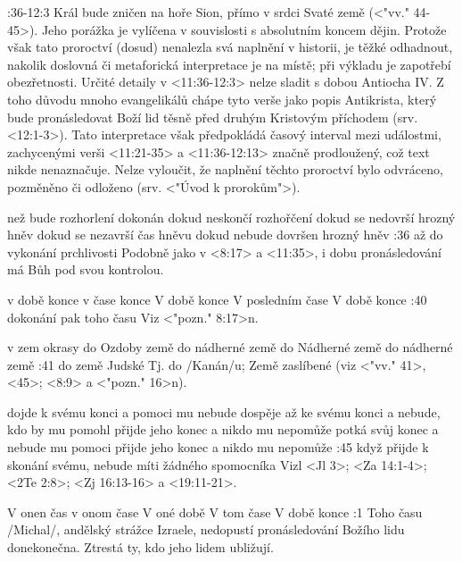 :36-12:3 {}
    Král bude zničen na hoře Sion, přímo v srdci Svaté země (<"vv." 44-45>).  
    Jeho porážka je vylíčena v souvislosti s absolutním koncem dějin.
    Protože však tato proroctví (dosud)  nenalezla svá naplnění v historii, je těžké odhadnout, nakolik doslovná či metaforická interpretace je na místě; při  výkladu je zapotřebí obezřetnosti. 
    Určité detaily v <11:36-12:3> nelze sladit s dobou Antiocha IV.
    Z toho důvodu mnoho evangelikálů chápe tyto verše jako popis Antikrista, který bude pronásledovat Boží lid těsně před druhým Kristovým příchodem (srv. <12:1-3>). Tato interpretace však předpokládá  časový interval mezi událostmi, zachycenými  verši <11:21-35> a  <11:36-12:13> značně prodloužený, což  text nikde nenaznačuje.
    Nelze vyloučit, že naplnění těchto proroctví bylo odvráceno,  pozměněno či odloženo (srv. <"Úvod k prorokům">).
    
    

    {než bude rozhorlení dokonán}   %
    {dokud neskončí rozhořčení}   %
    {dokud se nedovrší hrozný hněv}   %
    {dokud se nezavrší čas hněvu}  %
    {dokud nebude dovršen hrozný hněv}   %
:36 {až do vykonání prchlivosti}  
    Podobně jako v <8:17> a <11:35>, i dobu pronásledování má Bůh pod svou kontrolou.


    {v době konce}   %
    {v čase konce}   %
    {V době konce}   %
    {V posledním čase}   %
    {V době konce}   %
:40 {dokonání pak toho času}  
    Viz <"pozn." 8:17>n.

    {v zem okrasy}   %
    {do Ozdoby země}   %
    {do nádherné země}   %
    {do Nádherné země}   %
    {do nádherné země}   %
:41 {do země Judské}
    Tj. do \x/Kanán/u;  Země zaslíbené (viz <"vv." 41>, <45>; <8:9> a <"pozn." 16>n).


    {dojde k svému konci a pomoci mu nebude}   %
    {dospěje až ke svému konci a nebude, kdo by mu pomohl}   %
    {přijde jeho konec a nikdo mu nepomůže}   %
    {potká svůj konec a nebude mu pomoci}   %
    {přijde jeho konec a nikdo mu nepomůže}   %
:45 {když přijde k skonání svému, nebude míti žádného spomocníka}  
    Vizl <Jl 3>;  <Za 14:1-4>; <2Te 2:8>;  <Zj 16:13-16> a <19:11-21>.
    
    

    {V onen čas}   %
    {v onom čase}   %
    {V oné době}   %
    {V tom čase}   %
    {V době konce}   %
:1 {Toho času} \x/Michal/, andělský strážce Izraele, nedopustí pronásledování Božího lidu donekonečna. Ztrestá ty, kdo jeho lidem ubližují. 


